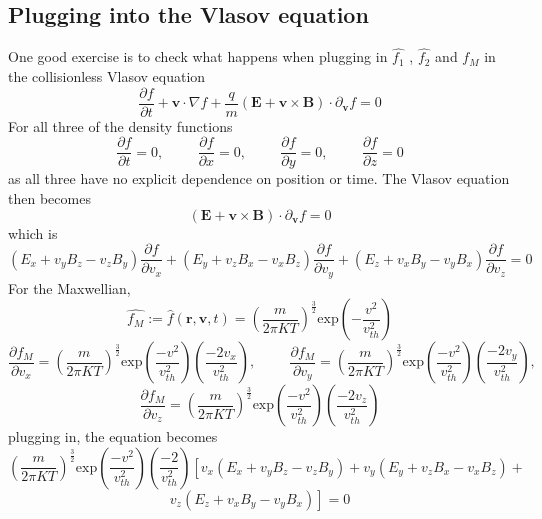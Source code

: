 \documentclass[12pt]{article}
\begin{document}
{	\subsection{Plugging into the Vlasov equation}
	One good exercise is to check what happens when plugging in  $\hat{f_{1}}$ , $\hat{f_{2}}$ and $f_{M}$ in  the collisionless Vlasov equation
	$$ \frac{\partial f}{\partial t} + \textbf{v} \cdot \nabla f + \frac{q}{m} \left(\mathrm{\textbf{E}}+\textbf{v} \times \mathrm{\textbf{B}} \right) \cdot {\partial}_{\textbf{v}} f = 0 $$
	For all three of the density functions
	$$\frac{\displaystyle \partial f}{\displaystyle \partial t} = 0 \mathrm{,} \hspace{1cm} \frac{\displaystyle \partial f}{\displaystyle \partial x} = 0 \mathrm{,} \hspace{1cm} \frac{\displaystyle \partial f}{\displaystyle \partial y} = 0 \mathrm{,} \hspace{1cm} \frac{\displaystyle \partial f}{\displaystyle \partial z} = 0 $$ as all three have no explicit dependence on position or time. The Vlasov equation then becomes $$ \left(\mathrm{\textbf{E}}+\textbf{v} \times \mathrm{\textbf{B}} \right) \cdot {\partial}_{\textbf{v}} f = 0 $$ which is 
	$$ \left(E_{x} + v_{y} B_{z} - v_{z} B_{y}\right) \frac{\displaystyle \partial f}{\displaystyle \partial v_{x}} + \left(E_{y} + v_{z} B_{x} - v_{x} B_{z}\right) \frac{\displaystyle \partial f}{\displaystyle \partial v_{y}} + \left(E_{z} + v_{x} B_{y} - v_{y} B_{x}\right) \frac{\displaystyle \partial f}{\displaystyle \partial v_{z}} = 0$$
	For the Maxwellian, $$ 	\widehat{f_{M}} := \hat{f}(\textbf{r}, \textbf{v}, t) = \left(\frac{m}{2\pi KT}\right)^{\frac{3}{2}} \mathrm{exp}\left(-\frac{v^{2}}{v_{th}^{2}}\right) $$
	$$\frac{\displaystyle \partial f_{M}}{\displaystyle \partial v_{x}} = \left(\frac{m}{2 \pi K T}\right)^{\frac{3}{2}}  \mathrm{exp} \left(\frac{-v^{2}}{v_{th}^{2}}\right)\left(\frac{-2 v_{x}}{v_{th}^{2}}\right)\mathrm{,} \hspace{1cm} \frac{\displaystyle \partial f_{M}}{\displaystyle \partial v_{y}} = \left(\frac{m}{2 \pi K T}\right)^{\frac{3}{2}}  \mathrm{exp} \left(\frac{-v^{2}}{v_{th}^{2}}\right)\left(\frac{-2 v_{y}}{v_{th}^{2}}\right) \mathrm{,}$$ $$\frac{\displaystyle \partial f_{M}}{\displaystyle \partial v_{z}} = \left(\frac{m}{2 \pi K T}\right)^{\frac{3}{2}}  \mathrm{exp} \left(\frac{-v^{2}}{v_{th}^{2}}\right)\left(\frac{-2 v_{z}}{v_{th}^{2}}\right)$$
	plugging in, the equation becomes
	$$\left(\frac{m}{2 \pi K T}\right)^{\frac{3}{2}}  \mathrm{exp} \left(\frac{-v^{2}}{v_{th}^{2}}\right)\left(\frac{-2}{v_{th}^{2}}\right) \left[v_{x}\left( E_{x} + v_{y} B_{z} - v_{z} B_{y} \right) + v_{y} \left( E_{y} + v_{z} B_{x} - v_{x} B_{z} \right) + \right.$$ $$\left. v_{z} \left(E_{z} + v_{x} B_{y} - v_{y} B_{x}\right) \right] = 0$$
}
\end{document}
